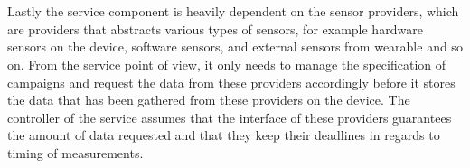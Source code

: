 \\\\
Lastly the service component is heavily dependent on the sensor providers, which are providers that abstracts various types of sensors, for example hardware sensors on the device, software sensors, and external sensors from wearable and so on. From the service point of view, it only needs to manage the specification of campaigns and request the data from these providers accordingly before it stores the data that has been gathered from these providers on the device. The controller of the service assumes that the interface of these providers guarantees the amount of data requested and that they keep their deadlines in regards to timing of measurements.
